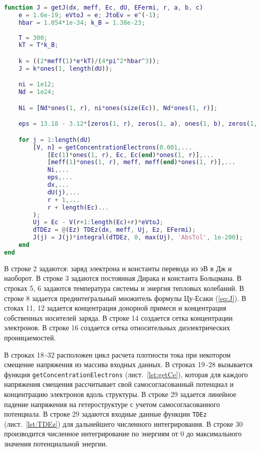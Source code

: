 \begin{lstlisting}[style=realcode,language=Matlab,caption={Расчет плотности тока по формуле Цу-Есаки (\ref{eq:J}) с учетом самосогласованного потенциала},label={lst:JV}]
function J = getJ(dx, meff, Ec, dU, EFermi, r, a, b, c)
	e = 1.6e-19; eVtoJ = e; JtoEv = e^(-1); 
	hbar = 1.054*1e-34; k_B = 1.38e-23;
	
	T = 300;
	kT = T*k_B;

	k = ((2*meff(1)*e*kT)/(4*pi^2*hbar^3));
	J = k*ones(1, length(dU));

	ni = 1e12;
	Nd = 1e24;

	Ni = [Nd*ones(1, r), ni*ones(size(Ec)), Nd*ones(1, r)];

	eps = 13.18 - 3.12*[zeros(1, r), zeros(1, a), ones(1, b), zeros(1, c), ones(1, b), zeros(1, a), zeros(1, r)];

	for j = 1:length(dU)
		[V, n] = getConcentrationElectrons(0.001,...
			[Ec(1)*ones(1, r), Ec, Ec(end)*ones(1, r)],...
			[meff(1)*ones(1, r), meff, meff(end)*ones(1, r)],...
			Ni,...
			eps,...
			dx,...
			dU(j),...
			r + 1,...
			r + length(Ec)...
		);
		Uj = Ec - V(r+1:length(Ec)+r)*eVtoJ;
		dTDEz = @(Ez) TDEz(dx, meff, Uj, Ez, EFermi);
		J(j) = J(j)*integral(dTDEz, 0, max(Uj), 'AbsTol', 1e-200);
	end
end
\end{lstlisting}
В строке 2 задаются: заряд электрона и константы перевода из эВ в Дж и наоборот. В строке 3 задаются постоянная Дирака и константа Больцмана. В строках 5, 6 задаются температура системы и энергия тепловых колебаний. В строке 8 задается прединтегральный множитель формулы Цу-Есаки (\ref{eq:J}). В стоках 11, 12 задается концентрация донорной примеси и концентрация собственных носителей заряда. В строке 14 создается сетка концентрации электронов. В строке 16 создается сетка относительных диэлектрических проницаемостей.

В строках 18\,-32 расположен цикл расчета плотности тока при некотором смещение напряжения из массива входных данных. В строках 19\,-28 вызывается функция \texttt{getConcentrationElectrons} (лист.~\ref{lst:getCe}), которая для каждого напряжения смещения рассчитывает свой самосогласованный потенциал и концентрацию электронов вдоль структуры. В строке 29 задается линейное падение напряжения на гетероструктуре с учетом самосогласованного потенциала. В строке 29 задаются входные данные функции \texttt{TDEz} (лист.~\ref{lst:TDEz}) для дальнейшего численного интегрирования. В строке 30 производится численное интегрирование по энергиям от 0 до максимального значения потенциальной энергии.

